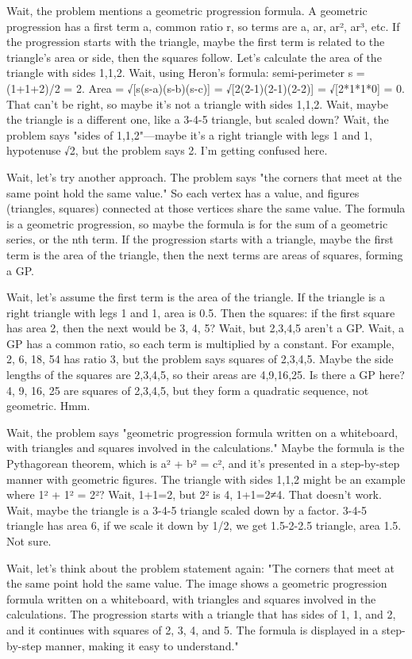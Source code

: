 Wait, the problem mentions a geometric progression formula. A geometric progression has a first term a, common ratio r, so terms are a, ar, ar², ar³, etc. If the progression starts with the triangle, maybe the first term is related to the triangle's area or side, then the squares follow. Let's calculate the area of the triangle with sides 1,1,2. Wait, using Heron's formula: semi-perimeter s = (1+1+2)/2 = 2. Area = √[s(s-a)(s-b)(s-c)] = √[2(2-1)(2-1)(2-2)] = √[2*1*1*0] = 0. That can't be right, so maybe it's not a triangle with sides 1,1,2. Wait, maybe the triangle is a different one, like a 3-4-5 triangle, but scaled down? Wait, the problem says "sides of 1,1,2"—maybe it's a right triangle with legs 1 and 1, hypotenuse √2, but the problem says 2. I'm getting confused here.

Wait, let's try another approach. The problem says "the corners that meet at the same point hold the same value." So each vertex has a value, and figures (triangles, squares) connected at those vertices share the same value. The formula is a geometric progression, so maybe the formula is for the sum of a geometric series, or the nth term. If the progression starts with a triangle, maybe the first term is the area of the triangle, then the next terms are areas of squares, forming a GP.

Wait, let's assume the first term is the area of the triangle. If the triangle is a right triangle with legs 1 and 1, area is 0.5. Then the squares: if the first square has area 2, then the next would be 3, 4, 5? Wait, but 2,3,4,5 aren't a GP. Wait, a GP has a common ratio, so each term is multiplied by a constant. For example, 2, 6, 18, 54 has ratio 3, but the problem says squares of 2,3,4,5. Maybe the side lengths of the squares are 2,3,4,5, so their areas are 4,9,16,25. Is there a GP here? 4, 9, 16, 25 are squares of 2,3,4,5, but they form a quadratic sequence, not geometric. Hmm.

Wait, the problem says "geometric progression formula written on a whiteboard, with triangles and squares involved in the calculations." Maybe the formula is the Pythagorean theorem, which is a² + b² = c², and it's presented in a step-by-step manner with geometric figures. The triangle with sides 1,1,2 might be an example where 1² + 1² = 2²? Wait, 1+1=2, but 2² is 4, 1+1=2≠4. That doesn't work. Wait, maybe the triangle is a 3-4-5 triangle scaled down by a factor. 3-4-5 triangle has area 6, if we scale it down by 1/2, we get 1.5-2-2.5 triangle, area 1.5. Not sure.

Wait, let's think about the problem statement again: "The corners that meet at the same point hold the same value. The image shows a geometric progression formula written on a whiteboard, with triangles and squares involved in the calculations. The progression starts with a triangle that has sides of 1, 1, and 2, and it continues with squares of 2, 3, 4, and 5. The formula is displayed in a step-by-step manner, making it easy to understand."

